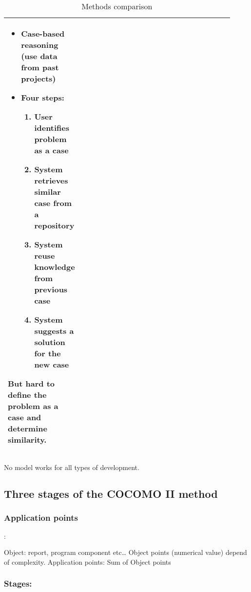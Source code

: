 \begin{table}[!ht]
\begin{tabular}{p{0.17\linewidth}p{0.75\linewidth}}
\begin{minipage}{\linewidth}
\begin{itemize}
                                \item Case-based reasoning (use data from past projects)
                                \item Four steps:
                                    \begin{enumerate}
                                        \item User identifies problem as a case
                                        \item System retrieves similar case from a
                                        repository
                                        \item System reuse knowledge from previous
                                        case
                                        \item System suggests a solution for the
                                        new case
                                    \end{enumerate}
                            \end{itemize}
                            But hard to define the problem as a case and
                            determine similarity.\end{minipage} \\
        \bottomrule
    \end{tabular}
    \caption{Methods comparison}
\end{table}

No model works for all types of development.

\subsection{Three stages of the COCOMO II method}

\subsubsection{Application points}:

Object: report, program component etc\ldots \newline
Object points (numerical value) depend of complexity. \newline
Application points: Sum of Object points

\subsubsection{Stages:}

